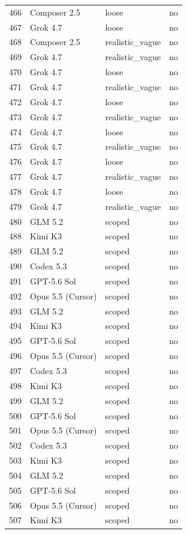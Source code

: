 \begin{tabular}{llll}
466 & Composer 2.5 & loose & no \\
467 & Grok 4.7 & loose & no \\
468 & Composer 2.5 & realistic\_vague & no \\
469 & Grok 4.7 & realistic\_vague & no \\
470 & Grok 4.7 & loose & no \\
471 & Grok 4.7 & realistic\_vague & no \\
472 & Grok 4.7 & loose & no \\
473 & Grok 4.7 & realistic\_vague & no \\
474 & Grok 4.7 & loose & no \\
475 & Grok 4.7 & realistic\_vague & no \\
476 & Grok 4.7 & loose & no \\
477 & Grok 4.7 & realistic\_vague & no \\
478 & Grok 4.7 & loose & no \\
479 & Grok 4.7 & realistic\_vague & no \\
480 & GLM 5.2 & scoped & no \\
488 & Kimi K3 & scoped & no \\
489 & GLM 5.2 & scoped & no \\
490 & Codex 5.3 & scoped & no \\
491 & GPT-5.6 Sol & scoped & no \\
492 & Opus 5.5 (Cursor) & scoped & no \\
493 & GLM 5.2 & scoped & no \\
494 & Kimi K3 & scoped & no \\
495 & GPT-5.6 Sol & scoped & no \\
496 & Opus 5.5 (Cursor) & scoped & no \\
497 & Codex 5.3 & scoped & no \\
498 & Kimi K3 & scoped & no \\
499 & GLM 5.2 & scoped & no \\
500 & GPT-5.6 Sol & scoped & no \\
501 & Opus 5.5 (Cursor) & scoped & no \\
502 & Codex 5.3 & scoped & no \\
503 & Kimi K3 & scoped & no \\
504 & GLM 5.2 & scoped & no \\
505 & GPT-5.6 Sol & scoped & no \\
506 & Opus 5.5 (Cursor) & scoped & no \\
507 & Kimi K3 & scoped & no \\

\end{tabular}
